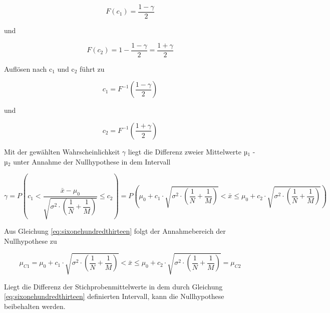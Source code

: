 \begin{equation}\label{eq:sixonehundrednine}
F(c_{1})=\dfrac{1-\gamma }{2}
\end{equation}

\noindent und 

\begin{equation}\label{eq:sixonehundredten}
F(c_{2})=1-\dfrac{1-\gamma }{2} =\dfrac{1+\gamma }{2}
\end{equation}

\noindent Aufl\"{o}sen nach c$_{1}$ und c$_{2}$ f\"{u}hrt zu

\begin{equation}\label{eq:sixonehundredeleven}
c_{1} =F^{-1} \left(\dfrac{1-\gamma }{2} \right)
\end{equation}

\noindent und

\begin{equation}\label{eq:sixonehundredtwelve}
c_{2} =F^{-1} \left(\dfrac{1+\gamma }{2} \right)
\end{equation}

\noindent Mit der gew\"{a}hlten Wahrscheinlichkeit $\gamma$ liegt die Differenz zweier Mittelwerte µ$_{1}$ - µ$_{2}$ unter Annahme der Nullhypothese in dem Intervall

\begin{equation}\label{eq:sixonehundredthirteen}
\gamma =P\left(c_{1} <\dfrac{\bar{x}-\mu _{0} }{\sqrt{\sigma ^{2} \cdot \left(\dfrac{1}{N} +\dfrac{1}{M} \right)} } \le c_{2} \right)=P\left(\mu _{0} +c_{1} \cdot \sqrt{\sigma ^{2} \cdot \left(\dfrac{1}{N} +\dfrac{1}{M} \right)} <\bar{x}\le \mu _{0} +c_{2} \cdot \sqrt{\sigma ^{2} \cdot \left(\dfrac{1}{N} +\dfrac{1}{M} \right)} \right)
\end{equation}

\noindent Aus Gleichung \eqref{eq:sixonehundredthirteen} folgt der Annahmebereich der Nullhypothese zu

\begin{equation}\label{eq:sixonehundredfourteen}
\mu _{C1} =\mu _{0} +c_{1} \cdot \sqrt{\sigma ^{2} \cdot \left(\dfrac{1}{N} +\dfrac{1}{M} \right)} <\bar{x}\le \mu _{0} +c_{2} \cdot \sqrt{\sigma ^{2} \cdot \left(\dfrac{1}{N} +\dfrac{1}{M} \right)} =\mu _{C2}
\end{equation}

\noindent Liegt die Differenz der Stichprobenmittelwerte in dem durch Gleichung \eqref{eq:sixonehundredthirteen} definierten Intervall, kann die Nullhypothese beibehalten werden. \newline

